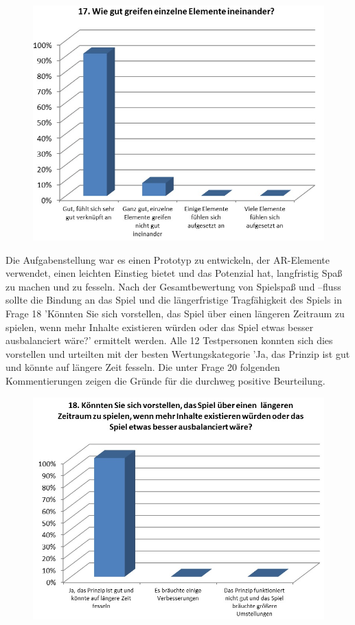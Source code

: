 \documentclass[extern,palatino]{cgBA}
\begin{document}
\begin{figure}[H]
	\centering
	\includegraphics[width=1\textwidth]{table14.jpg}
\end{figure}
Die Aufgabenstellung war es einen Prototyp zu entwickeln, der AR-Elemente verwendet, einen leichten Einstieg bietet und das Potenzial hat, langfristig Spaß zu machen und zu fesseln. Nach der Gesamtbewertung von Spielspaß und –fluss sollte die Bindung an das Spiel und die längerfristige Tragfähigkeit des Spiels in Frage 18 'Könnten Sie sich vorstellen, das Spiel über einen  längeren Zeitraum zu spielen, wenn mehr Inhalte existieren würden oder das Spiel etwas besser ausbalanciert wäre?' ermittelt werden. Alle 12 Testpersonen konnten sich dies vorstellen und urteilten mit der besten Wertungskategorie 'Ja, das Prinzip ist gut und könnte auf längere Zeit fesseln. Die unter Frage 20 folgenden Kommentierungen zeigen die Gründe für die durchweg positive Beurteilung.
\begin{figure}[H]
	\centering
	\includegraphics[width=1\textwidth]{table15.jpg}
\end{figure} 
\end{document}
